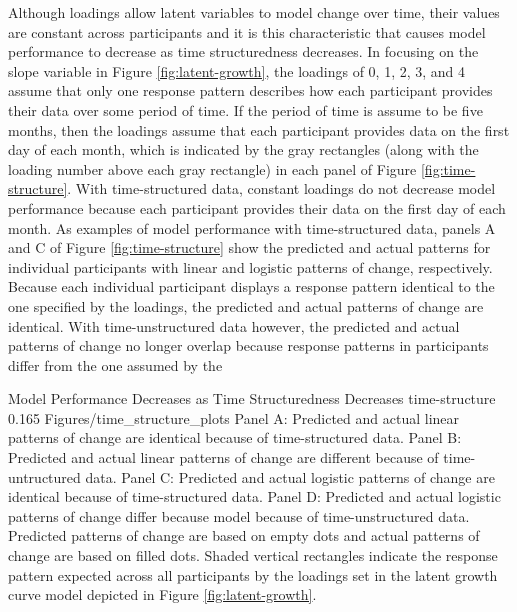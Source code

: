 \documentclass[
12pt, %
twoside,
english]{guelphthesis}
\begin{document}
Although loadings allow latent variables to model change over time, their values are constant across participants and it is this characteristic that causes model performance to decrease as time structuredness decreases. In focusing on the slope variable in Figure \ref{fig:latent-growth}, the loadings of 0, 1, 2, 3, and 4 assume that only one response pattern describes how each participant provides their data over some period of time. If the period of time is assume to be five months, then the loadings assume that each participant provides data on the first day of each month, which is indicated by the gray rectangles (along with the loading number above each gray rectangle) in each panel of Figure \ref{fig:time-structure}. With time-structured data, constant loadings do not decrease model performance because each participant provides their data on the first day of each month. As examples of model performance with time-structured data, panels A and C of Figure \ref{fig:time-structure} show the predicted and actual patterns for individual participants with linear and logistic patterns of change, respectively. Because each individual participant displays a response pattern identical to the one specified by the loadings, the predicted and actual patterns of change are identical. With time-unstructured data however, the predicted and actual patterns of change no longer overlap because response patterns in participants differ from the one assumed by the
\begin{apaFigure}
[portrait]
[samepage]
[-0.2cm]
{Model Performance Decreases as Time Structuredness Decreases}
{time-structure}
{0.165}
{Figures/time_structure_plots}
{Panel A: Predicted and actual linear patterns of change are identical because of time-structured data. Panel B: Predicted and actual linear patterns of change are different because of time-untructured data. Panel C: Predicted and actual logistic patterns of change are identical because of time-structured data. Panel D: Predicted and actual logistic patterns of change differ because model because of time-unstructured data. Predicted patterns of change are based on empty dots and actual patterns of change are based on filled dots. Shaded vertical rectangles indicate the response pattern expected across all participants by the loadings set in the latent growth curve model depicted in Figure \ref{fig:latent-growth}.}
\end{apaFigure}
\end{document}

